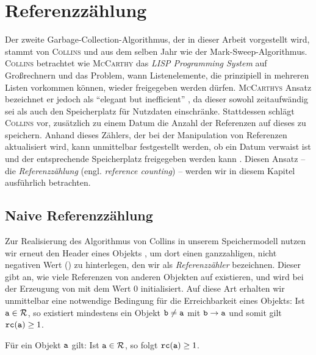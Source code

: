 \chapter{Referenzzählung}
\label{cha:reference-counting}
Der zweite Garbage-Collection-Algorithmus, der in dieser Arbeit vorgestellt wird, stammt von \textsc{Collins} und aus dem selben Jahr wie der Mark-Sweep-Algorithmus.
\textsc{Collins} betrachtet wie \textsc{McCarthy} das \textit{LISP Programming System} auf Großrechnern und das Problem, wann Listenelemente, die prinzipiell in mehreren Listen vorkommen können, wieder freigegeben werden dürfen.
\textsc{McCarthys} Ansatz bezeichnet er jedoch als \enquote{elegant but inefficient} \cite[S. 655]{collins1960}, da dieser sowohl zeitaufwändig sei als auch den Speicherplatz für Nutzdaten einschränke.
Stattdessen schlägt \textsc{Collins} vor, zusätzlich zu einem Datum die Anzahl der Referenzen auf dieses zu speichern.
Anhand dieses Zählers, der bei der Manipulation von Referenzen aktualisiert wird, kann unmittelbar festgestellt werden, ob ein Datum verwaist ist und der entsprechende Speicherplatz freigegeben werden kann \cite[S. 656f]{collins1960}.
Diesen Ansatz -- die \textit{Referenzzählung} (engl. \textit{reference counting}) -- werden wir in diesem Kapitel ausführlich betrachten.




\section{Naive Referenzzählung}
\label{sec:naive-rc}
Zur Realisierung des Algorithmus von Collins in unserem Speichermodell nutzen wir erneut den Header eines Objekts , um dort einen ganzzahligen, nicht negativen Wert () zu hinterlegen, den wir als \textit{Referenzzähler} bezeichnen.
Dieser gibt an, wie viele Referenzen von anderen Objekten auf  existieren, und wird bei der Erzeugung von  mit dem Wert $0$ initialisiert.
Auf diese Art erhalten wir unmittelbar eine notwendige Bedingung für die Erreichbarkeit eines Objekts:
Ist $\texttt{a} \in \mathcal{R}$, so existiert mindestens ein Objekt $\texttt{b} \neq \texttt{a}$ mit $\texttt{b} \rightarrow \texttt{a}$ und somit gilt $\texttt{rc}(\texttt{a}) \geq 1$.

\begin{mybox}
\begin{lemma}
\label{lemma:notwendig-rc}
	Für ein Objekt $\texttt{a}$ gilt: Ist $\texttt{a} \in \mathcal{R}$, so folgt $\texttt{rc}(\texttt{a}) \geq 1$.
\end{lemma}
\end{mybox}

